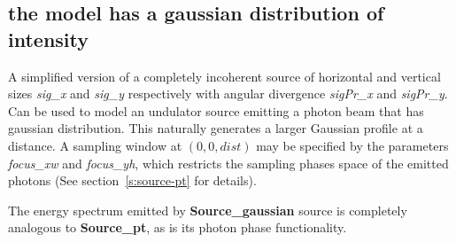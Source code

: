 \subsection*{the model has a gaussian distribution of intensity}
\label{source-gaussian}
A simplified version of a completely incoherent source of horizontal and
vertical sizes \textit{sig\_x} and \textit{sig\_y} respectively with angular divergence
\textit{sigPr\_x} and \textit{sigPr\_y}. Can be used to model an undulator source emitting
a photon beam that has gaussian distribution.
This naturally generates a larger Gaussian profile at a distance. A sampling window at $(0,0,\mathit{dist})$
may be specified by the parameters \textit{focus\_xw} and \textit{focus\_yh}, which restricts the
sampling phases space of the emitted photons (See section~\ref{s:source-pt} for details).

The energy spectrum emitted by \textbf{Source\_gaussian} source is completely analogous to \textbf{Source\_pt}, as is 
its photon phase functionality.
